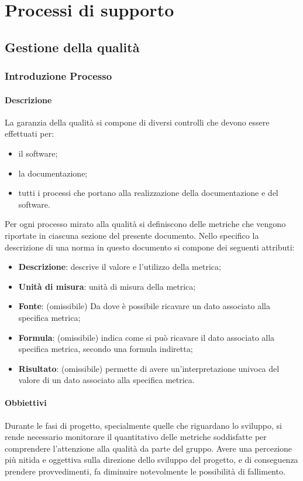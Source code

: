 \section{Processi di supporto}
	\subsection{Gestione della qualità}
		\subsubsection{Introduzione Processo}
			\paragraph{Descrizione}
				La garanzia della qualità si compone di diversi controlli che devono essere effettuati per:
				\begin{itemize}
					\item il software;
					\item la documentazione;
					\item tutti i processi che portano alla realizzazione della documentazione e del software.
				\end{itemize}
				Per ogni processo mirato alla qualità si definiscono delle metriche che vengono riportate in ciascuna sezione del presente documento. Nello specifico la descrizione di una norma in questo documento si compone dei seguenti attributi:
				\begin{itemize}
					\item\textbf{Descrizione}: descrive il valore e l’utilizzo della metrica;
					\item\textbf{Unità di misura}: unità di misura della metrica;
					\item\textbf{Fonte}: (omissibile) Da dove è possibile ricavare un dato associato alla specifica metrica;	
					\item\textbf{Formula}: (omissibile) indica come si può ricavare il dato associato alla specifica metrica, secondo una formula indiretta;
					\item\textbf{Risultato}: (omissibile) permette di avere un’interpretazione univoca del valore di un dato associato alla specifica metrica.
				\end{itemize}
			\paragraph{Obbiettivi}
				Durante le fasi di progetto, specialmente quelle che riguardano lo sviluppo, si rende necessario monitorare il quantitativo delle metriche soddisfatte per comprendere l'attenzione alla qualità da parte del gruppo. Avere una percezione più nitida e oggettiva sulla direzione dello sviluppo del progetto, e di conseguenza prendere provvedimenti, fa diminuire notevolmente le possibilità di fallimento.
